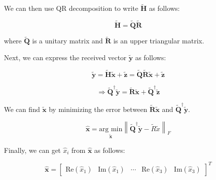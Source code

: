 \documentclass[fleqn]{article}
\newcommand{\norm}[1]{\left \lVert #1 \right \rVert}
\begin{document}
\begin{enumerate}
\begin{enumerate}
			We can then use QR decomposition to write $\mathbf{\tilde{H}}$ as follows:
			
			\begin{equation*}
				\mathbf{\tilde{H}} = \mathbf{\tilde{Q}}\mathbf{\tilde{R}}
			\end{equation*}
		\end{enumerate}
		
		where $\mathbf{\tilde{Q}}$ is a unitary matrix and $\mathbf{\tilde{R}}$ is an upper triangular matrix.
		
		Next, we can express the received vector $\mathbf{\tilde{y}}$ as follows:
		
		\begin{equation*}
			\mathbf{\tilde{y}} = \mathbf{\tilde{H}\tilde{x}} + \mathbf{\tilde{z}} = \mathbf{\tilde{Q}\tilde{R}\tilde{x}} + \mathbf{\tilde{z}}
		\end{equation*}
		
		\begin{equation*}
			\Rightarrow \mathbf{\tilde{Q}^{\dagger}\tilde{y}} = \mathbf{\tilde{R}\tilde{x}} + \mathbf{\tilde{Q}^{\dagger}\tilde{z}}
		\end{equation*}
		
		We can find $\mathbf{\tilde{x}}$ by minimizing the error between $\mathbf{\tilde{R}\tilde{x}}$ and $\mathbf{\tilde{Q}^{\dagger}\tilde{y}}$.
		
		\begin{equation*}
			\mathbf{\hat{x}} = \underset{\mathbf{\tilde{x}}}{\text{arg min}}{\norm{\mathbf{\tilde{Q}^{\dagger}\tilde{y}} - \tilde{R}\tilde{x}}_F}
		\end{equation*}
		
		Finally, we can get $\hat{x}_i$ from $\mathbf{\hat{x}}$ as follows:
		
		\begin{equation*}
			\mathbf{\hat{x}} = \begin{bmatrix}\text{Re}(\hat{x}_1) & \text{Im}(\hat{x}_1) & \cdots & \text{Re}(\hat{x}_3) & \text{Im}(\hat{x}_3)\end{bmatrix}^T
		\end{equation*}
		
		
	\end{enumerate}
\end{document}
